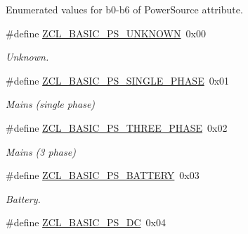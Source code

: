 Enumerated values for b0-\/b6 of Power\-Source attribute. \begin{DoxyCompactItemize}
\item 
\hypertarget{group__zcl__basic_ga98e9e01925bb6c52e1d8ff837a32116d}{\#define \hyperlink{group__zcl__basic_ga98e9e01925bb6c52e1d8ff837a32116d}{Z\-C\-L\-\_\-\-B\-A\-S\-I\-C\-\_\-\-P\-S\-\_\-\-U\-N\-K\-N\-O\-W\-N}~0x00}\label{group__zcl__basic_ga98e9e01925bb6c52e1d8ff837a32116d}

\begin{DoxyCompactList}\small\item\em Unknown. \end{DoxyCompactList}\item 
\hypertarget{group__zcl__basic_ga66eab175cd2834dbed155d4fa086e4d7}{\#define \hyperlink{group__zcl__basic_ga66eab175cd2834dbed155d4fa086e4d7}{Z\-C\-L\-\_\-\-B\-A\-S\-I\-C\-\_\-\-P\-S\-\_\-\-S\-I\-N\-G\-L\-E\-\_\-\-P\-H\-A\-S\-E}~0x01}\label{group__zcl__basic_ga66eab175cd2834dbed155d4fa086e4d7}

\begin{DoxyCompactList}\small\item\em Mains (single phase) \end{DoxyCompactList}\item 
\hypertarget{group__zcl__basic_gacd2c65021e4ac4544bfe2419697d2407}{\#define \hyperlink{group__zcl__basic_gacd2c65021e4ac4544bfe2419697d2407}{Z\-C\-L\-\_\-\-B\-A\-S\-I\-C\-\_\-\-P\-S\-\_\-\-T\-H\-R\-E\-E\-\_\-\-P\-H\-A\-S\-E}~0x02}\label{group__zcl__basic_gacd2c65021e4ac4544bfe2419697d2407}

\begin{DoxyCompactList}\small\item\em Mains (3 phase) \end{DoxyCompactList}\item 
\hypertarget{group__zcl__basic_ga9002aa7599325d8b9ef74743dc77eb4e}{\#define \hyperlink{group__zcl__basic_ga9002aa7599325d8b9ef74743dc77eb4e}{Z\-C\-L\-\_\-\-B\-A\-S\-I\-C\-\_\-\-P\-S\-\_\-\-B\-A\-T\-T\-E\-R\-Y}~0x03}\label{group__zcl__basic_ga9002aa7599325d8b9ef74743dc77eb4e}

\begin{DoxyCompactList}\small\item\em Battery. \end{DoxyCompactList}\item 
\hypertarget{group__zcl__basic_ga528fdcef318ec276618896c7cbfec618}{\#define \hyperlink{group__zcl__basic_ga528fdcef318ec276618896c7cbfec618}{Z\-C\-L\-\_\-\-B\-A\-S\-I\-C\-\_\-\-P\-S\-\_\-\-D\-C}~0x04}\label{group__zcl__basic_ga528fdcef318ec276618896c7cbfec618}


\end{DoxyCompactItemize}
